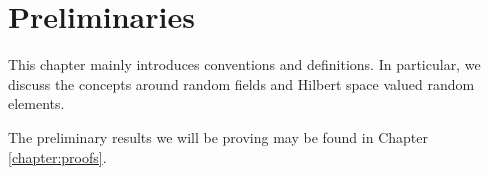 \chapter{Preliminaries}

This chapter mainly introduces conventions and definitions. In particular, we discuss the concepts around random fields and Hilbert space valued random elements.

The preliminary results we will be proving may be found in Chapter \ref{chapter:proofs}.












